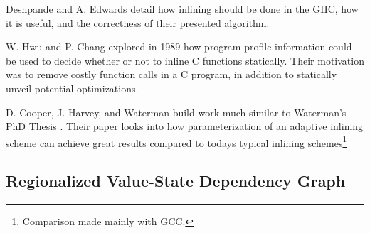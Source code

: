 Deshpande and A. Edwards \cite{deshpande2012statically} detail how inlining
should be done in the GHC, how it is useful, and the correctness of their
presented algorithm.

W. Hwu and P. Chang \cite{InlineFuncExpCProgs} explored in 1989 how program profile
information could be used to decide whether or not to inline C functions
statically. Their motivation was to remove costly function calls in  a C
program, in addition to statically unveil potential optimizations.

D. Cooper, J. Harvey, and Waterman \cite{AdaptvStratInlSubst} build work much
similar to Waterman's PhD Thesis \cite{AdaptvCompilAndInlingWaterman}. Their
paper looks into how parameterization of an adaptive inlining scheme can achieve
great results compared to todays typical inlining schemes\footnote{Comparison
made mainly with GCC.}

\subsection{Regionalized Value-State Dependency Graph}
